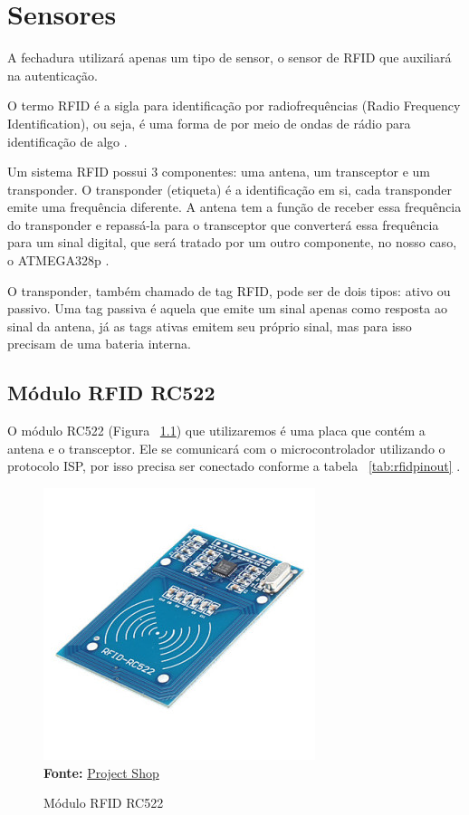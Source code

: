 \chapter{Sensores}
A fechadura utilizará apenas um tipo de sensor, o sensor de RFID que auxiliará
na autenticação.

O termo RFID é a sigla para identificação por radiofrequências (Radio Frequency
Identification), ou seja, é uma forma de por meio de ondas de rádio para identificação de
algo \cite{rouse2019}.

Um sistema RFID possui 3 componentes: uma antena, um transceptor e um
transponder. O transponder (etiqueta) é a identificação em si, cada transponder emite uma
frequência diferente. A antena tem a função de receber essa frequência do transponder e
repassá-la para o transceptor que converterá essa frequência para um sinal digital, que
será tratado por um outro componente, no nosso caso, o ATMEGA328p \cite{ciriaco2019}.

O transponder, também chamado de tag RFID, pode ser de dois tipos: ativo ou
passivo. Uma tag passiva é aquela que emite um sinal apenas como resposta ao sinal da
antena, já as tags ativas emitem seu próprio sinal, mas para isso precisam de uma bateria
interna.

\section{Módulo RFID RC522}

O módulo RC522 (Figura ~\ref{fig:rfid}) que utilizaremos é uma placa que contém a antena e
o transceptor. Ele se comunicará com o microcontrolador utilizando o protocolo ISP, por
isso precisa ser conectado conforme a tabela ~\ref{tab:rfidpinout} \cite{gbur2017}.

\FloatBarrier
\begin{figure}[!htbp]
	\centering
	\caption{Módulo RFID RC522}
	\includegraphics[scale=.3]{imagens/rfid}
	\\\textbf{Fonte:} \href{http://projectshopbd.com/product/rfid-rc522r15/}{Project Shop}
	\label{fig:rfid}
\end{figure}
\FloatBarrier

